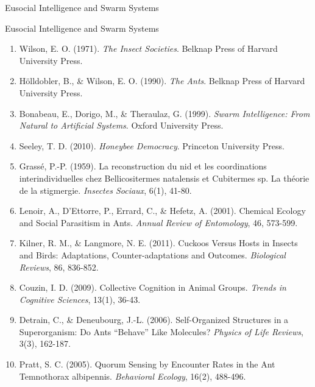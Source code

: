 \documentclass[
  ignorenonframetext,
]{beamer}
\begin{document}
\begin{frame}[allowframebreaks]{Eusocial Intelligence and Swarm Systems}
\protect{}\label{eusocial-intelligence-and-swarm-systems}
\end{frame}

\begin{frame}[allowframebreaks]{Eusocial Intelligence and Swarm Systems}
\begin{enumerate}
\item
  Wilson, E. O. (1971). \emph{The Insect Societies}. Belknap Press of
  Harvard University Press.
\item
  Hölldobler, B., \& Wilson, E. O. (1990). \emph{The Ants}. Belknap
  Press of Harvard University Press.
\item
  Bonabeau, E., Dorigo, M., \& Theraulaz, G. (1999). \emph{Swarm
  Intelligence: From Natural to Artificial Systems}. Oxford University
  Press.
\item
  Seeley, T. D. (2010). \emph{Honeybee Democracy}. Princeton University
  Press.
\item
  Grassé, P.-P. (1959). La reconstruction du nid et les coordinations
  interindividuelles chez Bellicositermes natalensis et Cubitermes sp.
  La théorie de la stigmergie. \emph{Insectes Sociaux}, 6(1), 41-80.
\item
  Lenoir, A., D'Ettorre, P., Errard, C., \& Hefetz, A. (2001). Chemical
  Ecology and Social Parasitism in Ants. \emph{Annual Review of
  Entomology}, 46, 573-599.
\item
  Kilner, R. M., \& Langmore, N. E. (2011). Cuckoos Versus Hosts in
  Insects and Birds: Adaptations, Counter-adaptations and Outcomes.
  \emph{Biological Reviews}, 86, 836-852.
\item
  Couzin, I. D. (2009). Collective Cognition in Animal Groups.
  \emph{Trends in Cognitive Sciences}, 13(1), 36-43.
\item
  Detrain, C., \& Deneubourg, J.-L. (2006). Self-Organized Structures in
  a Superorganism: Do Ants ``Behave'' Like Molecules? \emph{Physics of
  Life Reviews}, 3(3), 162-187.
\item
  Pratt, S. C. (2005). Quorum Sensing by Encounter Rates in the Ant
  Temnothorax albipennis. \emph{Behavioral Ecology}, 16(2), 488-496.
\end{enumerate}
\end{frame}
\end{document}

